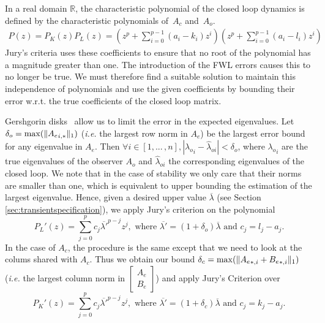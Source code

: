 \documentclass[sigconf]{llncs}
\DeclarePairedDelimiter\norm{\lVert}{\rVert}
\newcommand{\mat}[1]{{#1}}
\renewcommand{\note}[1]{\textcolor{red}{[#1]}}
\begin{document}
In a real domain $\mathbb{R}$, the characteristic polynomial
of the closed loop dynamics is defined by the characteristic polynomials of~$\mat{A}_c$
and~$\mat{A}_o$.  
\begin{align*}
P(z)=P_K(z)P_L(z)=\left(z^p+\sum_{i=0}^{p-1}{(a_i-k_i)z^{i}}\right) \left(z^p+\sum_{i=0}^{p-1}{(a_i-l_i)z^{i}}\right)
\end{align*}
Jury's criteria uses these coefficients to ensure that no root of the polynomial has a magnitude greater than one.
The introduction of the FWL errors causes this to no longer
be true.  We must therefore find a suitable solution to maintain this independence of polynomials and use the given coefficients by bounding their error w.r.t. the true coefficients of the closed loop matrix.

Gershgorin disks~\cite{van1996matrix} allow us to limit the error
in the expected eigenvalues.  Let $\delta_o=\max(\norm{{\mat{A}_e}_{i,*}}_1)$
(\emph{i.e.} the largest row norm in $\mat{A}_e$) be the largest error bound
for any eigenvalue in $\mat{A}_e$.  Then $\forall i \in [1, ...\,,n],
|{\lambda_o}_{i}-\hat{\lambda}_{oi}|<\delta_o$, where ${\lambda_o}_{i}$ are the
true eigenvalues of the observer $\mat{A}_o$ and $\hat{\lambda}_{oi}$
the corresponding eigenvalues of the closed loop. We note that in the case of
stability we only care that their norms are smaller than one, which is equivalent to
upper bounding the estimation of the largest eigenvalue.  Hence, given a
desired upper value $\overline{\lambda}$ (see Section \ref{sec:transientspecification}), we apply Jury's criterion on the
polynomial
%
\begin{equation}
P_L'(z)=\sum_{j=0}^p c_j\overline{\lambda'}^{p-j}z^j, \text{ where }  \overline{\lambda'}=(1+\delta_o)\overline{\lambda} \text{ and } c_j=l_j-a_j.
\end{equation}
%
In the case of $\mat{A}_c$, the procedure is the same except that we need to look at the colums shared with $\mat{A}_c$.
Thus we obtain our bound $\delta_c=\max(\norm{{\mat{A}_e}_{*,i}+{\mat{B}_e}_{*,i}}_1)$
(\emph{i.e.} the largest column norm in $ \left[\begin{array}{c}\mat{A}_e\\ \mat{B}_e\end{array}\right]$) and
apply Jury's Criterion over
%
\begin{equation}
P_K'(z)=\sum_{j=0}^p c_j\overline{\lambda'}^{p-j}z^j, \text{ where }  \overline{\lambda'}=(1+\delta_c)\overline{\lambda} \text{ and } c_j=k_j-a_j.
\end{equation}
\end{document}
